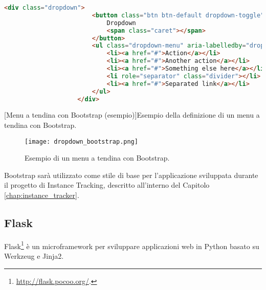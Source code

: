         	
            \begin{center}
                \begin{lstlisting}[language=html, gobble=18]
                    <div class="dropdown">
                        <button class="btn btn-default dropdown-toggle" type="button" id="dropdownMenu1" data-toggle="dropdown" aria-haspopup="true" aria-expanded="true">
                            Dropdown
                            <span class="caret"></span>
                        </button>
                        <ul class="dropdown-menu" aria-labelledby="dropdownMenu1">
                            <li><a href="#">Action</a></li>
                            <li><a href="#">Another action</a></li>
                            <li><a href="#">Something else here</a></li>
                            <li role="separator" class="divider"></li>
                            <li><a href="#">Separated link</a></li>
                        </ul>
                    </div>
                \end{lstlisting}
                \captionsetup{textformat=empty,labelformat=empty} \vspace{-2em}
                [Menu a tendina con Bootstrap (esempio)]{Esempio della definizione di un menu a tendina con Bootstrap.}
            \end{center}
            
        	\begin{figure}[h!]
        		\begin{center}
        			\texttt{[image: dropdown\_bootstrap.png]}
        		\end{center}
        		\caption[Menu a tendina con Bootstrap (esempio)]{Esempio di un menu a tendina con Bootstrap.}
        		\label{fig:dropdown_bootstrap}
        	\end{figure}
        	
        	Bootstrap sarà utilizzato come stile di base per l'applicazione sviluppata durante il progetto di Instance Tracking, descritto all'interno del Capitolo \ref{chap:instance_tracker}.
        
        \subsection{Flask} \label{subsec:p;sl;flask}
        
            Flask\footnote{\url{http://flask.pocoo.org/}.} è un microframework per sviluppare applicazioni web in Python basato su Werkzeug e Jinja2.
            
